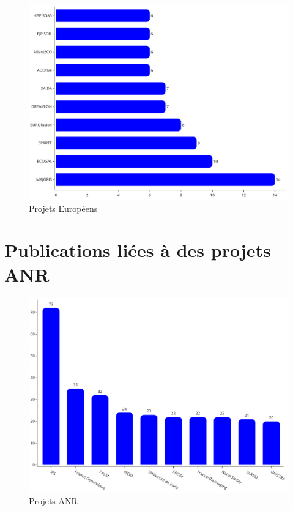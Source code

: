 \documentclass[french, 11pt]{dibiso/biso}
\begin{document}
\begin{figure}[!h]
  \includegraphics[width=.8\textwidth]{figures/european_projects.pdf}
  \centering
  \caption{Projets Européens}
  \label{fig_eu_projects}
\end{figure}








\section{Publications liées à des projets ANR}

\begin{figure}[!h]
  \includegraphics[width=.8\textwidth]{figures/anr_projects.pdf}
  \centering
  \caption{Projets ANR}
  \label{fig_anr_projects}
\end{figure}
\end{document}
